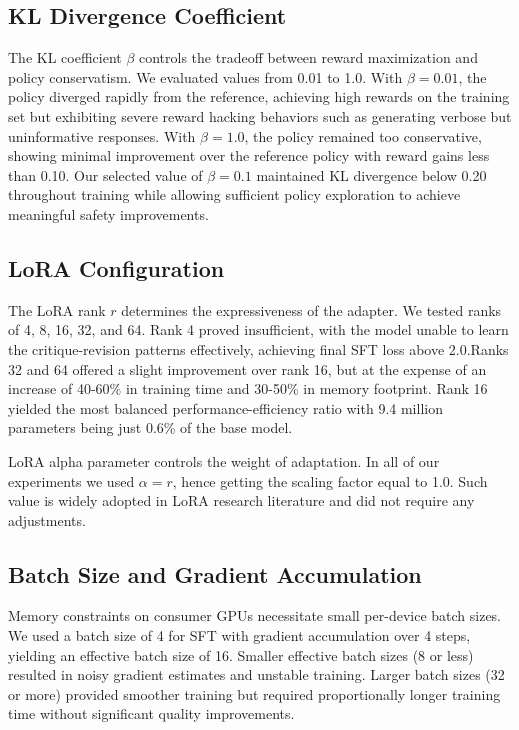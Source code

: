 \documentclass[conference]{IEEEtran}
\begin{document}
\subsection{KL Divergence Coefficient}

The KL coefficient $\beta$ controls the tradeoff between reward maximization and policy conservatism. We evaluated values from 0.01 to 1.0. With $\beta = 0.01$, the policy diverged rapidly from the reference, achieving high rewards on the training set but exhibiting severe reward hacking behaviors such as generating verbose but uninformative responses. With $\beta = 1.0$, the policy remained too conservative, showing minimal improvement over the reference policy with reward gains less than 0.10. Our selected value of $\beta = 0.1$ maintained KL divergence below 0.20 throughout training while allowing sufficient policy exploration to achieve meaningful safety improvements.

\subsection{LoRA Configuration}

The LoRA rank $r$ determines the expressiveness of the adapter. We tested ranks of 4, 8, 16, 32, and 64. Rank 4 proved insufficient, with the model unable to learn the critique-revision patterns effectively, achieving final SFT loss above 2.0.Ranks 32 and 64 offered a slight improvement over rank 16, but at the expense of an increase of 40-60\% in training time and 30-50\% in memory footprint. Rank 16 yielded the most balanced performance-efficiency ratio with 9.4 million parameters being just 0.6\% of the base model.

LoRA alpha parameter controls the weight of adaptation. In all of our experiments we used $\alpha = r$, hence getting the scaling factor equal to 1.0. Such value is widely adopted in LoRA research literature and did not require any adjustments.

\subsection{Batch Size and Gradient Accumulation}

Memory constraints on consumer GPUs necessitate small per-device batch sizes. We used a batch size of 4 for SFT with gradient accumulation over 4 steps, yielding an effective batch size of 16. Smaller effective batch sizes (8 or less) resulted in noisy gradient estimates and unstable training. Larger batch sizes (32 or more) provided smoother training but required proportionally longer training time without significant quality improvements.
\end{document}
